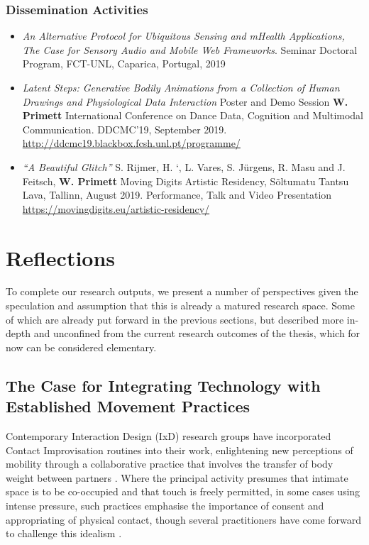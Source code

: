 \subsubsection{Dissemination Activities}
    \begin{itemize}

    \item[] \textit{An Alternative Protocol for Ubiquitous Sensing and mHealth Applications, The Case for Sensory Audio and Mobile Web Frameworks}. Seminar Doctoral Program, FCT-UNL, Caparica, Portugal, 2019

    \item[] \textit{Latent Steps: Generative Bodily Animations from a Collection of Human Drawings and Physiological Data Interaction} Poster and Demo Session
    \textbf{W. Primett}
    International Conference on Dance Data, Cognition and Multimodal Communication. DDCMC’19, September 2019.
    \url{http://ddcmc19.blackbox.fcsh.unl.pt/programme/}

    \item[] \textit{``A Beautiful Glitch''}
        S. Rijmer, H. `, L. Vares, S. Jürgens, R. Masu and J. Feitsch, \textbf{W. Primett}
    Moving Digits Artistic Residency, Sõltumatu Tantsu Lava, Tallinn, August 2019. Performance, Talk and Video Presentation
    \url{https://movingdigits.eu/artistic-residency/}
    \end{itemize}

\section{Reflections}
\label{sec:reflections}

To complete our research outputs, we present a number of perspectives given the speculation and assumption that this is already a matured research space. Some of which are already put forward in the previous sections, but described more in-depth and unconfined from the current research outcomes of the thesis, which for now can be considered elementary.

\subsection{The Case for Integrating Technology with Established Movement Practices}

Contemporary Interaction Design (IxD) research groups have incorporated Contact Improvisation routines into their work, enlightening new perceptions of mobility through a collaborative practice that involves the transfer of body weight between partners \cite{bomba_somacoustics_2019, barrero_gonzalez_dance_2019}. Where the principal activity presumes that intimate space is to be co-occupied and that touch is freely permitted, in some cases using intense pressure, such practices emphasise the importance of consent and appropriating of physical contact, though several practitioners have come forward to challenge this idealism \cite{tai_exploring_2017,beaulieux_how_2019}.

